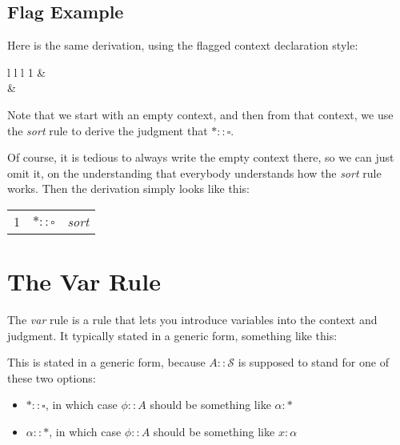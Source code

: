 \documentclass{book}
\numberwithin{equation}{chapter}
\newenvironment{typederivation}
  {\begin{tabular}[t]{l l l}}
  {\end{tabular}}
\newcommand{\tdcontext}[2]
  {
    &
    \multicolumn{2}{l}{
    \begin{tabular}[t]{| l l l}
    \multicolumn{3}{| l}{#1} \\\cline{1-2}
    & & \\
    #2
    \end{tabular}
    } \\ & \\
  }
\newcommand{\tdnum}[1]{#1}
\newcommand{\tdjudge}[1]{& #1}
\newcommand{\tdjustify}[1]{& #1 \\}
\begin{document}
\subsection{Flag Example}

Here is the same derivation, using the flagged context declaration style:

\begin{center}
\begin{typederivation}
\tdnum{1} \tdcontext{$\varnothing$}{
    \tdnum{2} \tdjudge{$\ast :: \square$} \tdjustify{\textit{sort}, 1}
}
\end{typederivation}
\end{center}

\noindent
Note that we start with an empty context, and then from that context, we use the \textit{sort} rule to derive the judgment that $\ast :: \square$.

Of course, it is tedious to always write the empty context there, so we can just omit it, on the understanding that everybody understands how the \textit{sort} rule works. Then the derivation simply looks like this:

\begin{center}
\begin{typederivation}
\tdnum{1} \tdjudge{$\ast :: \square$} \tdjustify{\textit{sort}}
\end{typederivation}
\end{center}


\section{The Var Rule}

The \textit{var} rule is a rule that lets you introduce variables into the context and judgment. It typically stated in a generic form, something like this:

\begin{prooftree}
\end{prooftree}

\noindent
This is stated in a generic form, because $A :: \mathcal{S}$ is supposed to stand for one of these two options:

\begin{itemize} 
\item{$\ast :: \square$, in which case $\phi :: A$ should be something like $\alpha : \ast$}
\item{$\alpha :: \ast$, in which case $\phi :: A$ should be something like $x : \alpha$}
\end{itemize}
\end{document}
